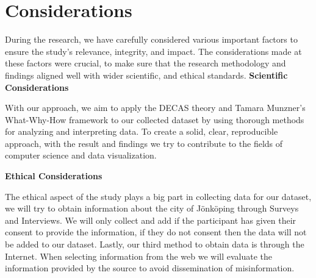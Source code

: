 \section{Considerations}

During the research, we have carefully considered various important factors to ensure the study’s relevance, integrity, and impact. The considerations made at these factors were crucial, to make sure that the research methodology and findings aligned well with wider scientific, and ethical standards. 
\textbf{Scientific Considerations}

With our approach, we aim to apply the DECAS theory and Tamara Munzner’s What-Why-How framework to our collected dataset by using thorough methods for analyzing and interpreting data. To create a solid, clear, reproducible approach, with the result and findings we try to contribute to the fields of computer science and data visualization.


\textbf{Ethical Considerations}

The ethical aspect of the study plays a big part in collecting data for our dataset, we will try to obtain information about the city of Jönköping through Surveys and Interviews. We will only collect and add if the participant has given their consent to provide the information, if they do not consent then the data will not be added to our dataset. Lastly, our third method to obtain data is through the Internet. When selecting information from the web we will evaluate the information provided by the source to avoid dissemination of misinformation. 


